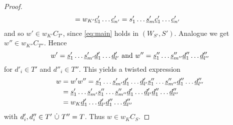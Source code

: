 \begin{theo}
\begin{proof}
\begin{align*}
				& = w_{K'} \underline{c}'_1 \ldots \underline{c}'_{n'} = s'_1 \ldots \underline{s}'_m \underline{c}'_1 \ldots \underline{c}'_{n'}
		\end{align*}
		and so $w' \in w_{K'}C_{T'}$, since \ref{eq:main} holds in $(W_{S'},S')$. Analogue we get $w'' \in w_{K''}C_{T''}$. Hence
		$$ w' = \underline{s}'_1 \ldots \underline{s}'_{m'} \underline{d}'_1 \ldots \underline{d}'_{l'} \textrm{ and } w'' = \underline{s}''_1 \ldots \underline{s}''_{m''} \underline{d}''_1 \ldots \underline{d}''_{l''} $$
		for $d'_i \in T'$ and $d''_i \in T''$. This yields a twisted expression
		\begin{align*}
			w	& = w' w'' = \underline{s}'_1 \ldots \underline{s}'_{m'} \underline{d}'_1 \ldots \underline{d}'_{l'} \underline{s}''_1 \ldots \underline{s}''_{m''} \underline{d}''_1 \ldots \underline{d}''_{l''} \\
				& = \underline{s}'_1 \ldots \underline{s}'_{m'} \underline{s}''_1 \ldots \underline{s}''_{m''} \underline{d}'_1 \ldots \underline{d}'_{l'} \underline{d}''_1 \ldots \underline{d}''_{l''} \\
				& = w_K \underline{d}'_1 \ldots \underline{d}'_{l'} \underline{d}''_1 \ldots \underline{d}''_{l''}
		\end{align*}
		with $d'_i,d''_i \in T' \ \dot \cup \  T'' = T$. Thus $w \in w_KC_S$.
	\end{proof}
\end{theo}